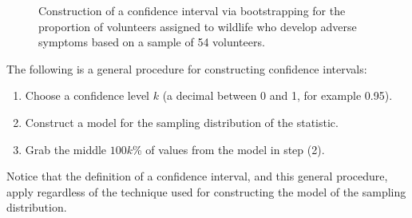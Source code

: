 \documentclass[
  letterpaper,
  DIV=11,
  numbers=noendperiod]{scrreprt}
\providecommand{\tightlist}{%
  \setlength{\itemsep}{0pt}\setlength{\parskip}{0pt}}\usepackage{longtable,booktabs,array}
\theoremstyle{definition}
\theoremstyle{definition}
\theoremstyle{plain}
\theoremstyle{remark}
\begin{document}
\begin{figure}


\caption{\label{fig-samplingdistns-deepwater-ci}Construction of a
confidence interval via bootstrapping for the proportion of volunteers
assigned to wildlife who develop adverse symptoms based on a sample of
54 volunteers.}

\end{figure}%

\begin{tcolorbox}[enhanced jigsaw, colbacktitle=quarto-callout-tip-color!10!white, colback=white, left=2mm, title=\textcolor{quarto-callout-tip-color}{\faLightbulb}\hspace{0.5em}{Process for Constructing a Confidence Interval}, toptitle=1mm, leftrule=.75mm, breakable, bottomrule=.15mm, arc=.35mm, rightrule=.15mm, toprule=.15mm, coltitle=black, opacityback=0, colframe=quarto-callout-tip-color-frame, opacitybacktitle=0.6, bottomtitle=1mm, titlerule=0mm]

The following is a general procedure for constructing confidence
intervals:

\begin{enumerate}
\def\labelenumi{\arabic{enumi}.}
\tightlist
\item
  Choose a confidence level \(k\) (a decimal between 0 and 1, for
  example 0.95).
\item
  Construct a model for the sampling distribution of the statistic.
\item
  Grab the middle \(100k\)\% of values from the model in step (2).
\end{enumerate}

Notice that the definition of a confidence interval, and this general
procedure, apply regardless of the technique used for constructing the
model of the sampling distribution.

\end{tcolorbox}
\end{document}
